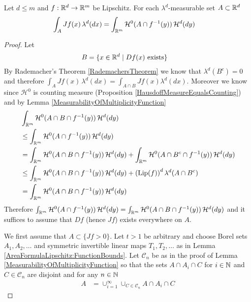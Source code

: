 \begin{thm}\label{AreaFormulaLipschitz}Let $d \leq m$ and $f : \mathbb{R}^d \to \mathbb{R}^m$ be Lipschitz.  For each $\lambda^d$-measurable set $A \subset \mathbb{R}^d$
\begin{align*}
\int_A Jf(x) \, \lambda^d(dx) &= \int_{\mathbb{R}^m} \mathcal{H}^0(A \cap f^{-1}(y)) \, \mathcal{H}^d(dy)
\end{align*}
\end{thm}
\begin{proof}
Let
\begin{align*}
B &= \lbrace x \in \mathbb{R}^d \mid Df(x) \text{ exists} \rbrace
\end{align*}
By Rademacher's Theorem \ref{RademachersTheorem} we know that $\lambda^d(B^c) = 0$ and therefore
$\int_{A} Jf(x) \, \lambda^d(dx) = \int_{A \cap B} Jf(x) \lambda^d(dx)$.  Moreover we know since $\mathcal{H}^0$ is counting measure (Proposition \ref{HausdoffMeasureEqualsCounting})
and by Lemma \ref{MeasurabilityOfMultiplicityFunction}
\begin{align*}
&\int_{\mathbb{R}^m} \mathcal{H}^0(A \cap B \cap f^{-1}(y)) \, \mathcal{H}^d(dy) \\
&\leq \int_{\mathbb{R}^m} \mathcal{H}^0(A \cap f^{-1}(y)) \, \mathcal{H}^d(dy) \\
&= \int_{\mathbb{R}^m} \mathcal{H}^0(A \cap B \cap f^{-1}(y)) \, \mathcal{H}^d(dy) + \int_{\mathbb{R}^m} \mathcal{H}^0(A \cap B^c \cap f^{-1}(y)) \, \mathcal{H}^d(dy) \\
&\leq \int_{\mathbb{R}^m} \mathcal{H}^0(A \cap B \cap f^{-1}(y)) \, \mathcal{H}^d(dy) +\left( \operatorname*{Lip}(f) \right)^d \lambda^d(A \cap B^c) \\
&=\int_{\mathbb{R}^m} \mathcal{H}^0(A \cap B \cap f^{-1}(y)) \, \mathcal{H}^d(dy) 
\end{align*} 
Therefore $\int_{\mathbb{R}^m} \mathcal{H}^0(A \cap f^{-1}(y)) \, \mathcal{H}^d(dy) = \int_{\mathbb{R}^m} \mathcal{H}^0(A \cap B \cap f^{-1}(y)) \, \mathcal{H}^d(dy)$ and it suffices to assume that $Df$ (hence $Jf$) exists everywhere on $A$.

We first assume that $A \subset \lbrace Jf > 0 \rbrace$.  Let $t > 1$ be arbitrary and choose Borel sets
$A_1, A_2, \dotsc$ and symmetric invertible linear maps $T_1, T_2, \dotsc$ as in Lemma \ref{AreaFormulaLipschitz:FunctionBounds}.
Let $\mathcal{C}_n$ be as in the proof of Lemma \ref{MeasurabilityOfMultiplicityFunction} so that the sets
$A \cap A_i \cap C$ for $i \in \mathbb{N}$ and $C \in \mathcal{C}_n$ are disjoint and for any $n \in \mathbb{N}$
\begin{align*}
A &= \cup_{i=1}^\infty \cup_{C \in \mathcal{C}_n} A \cap A_i \cap C
\end{align*}


\end{proof}
